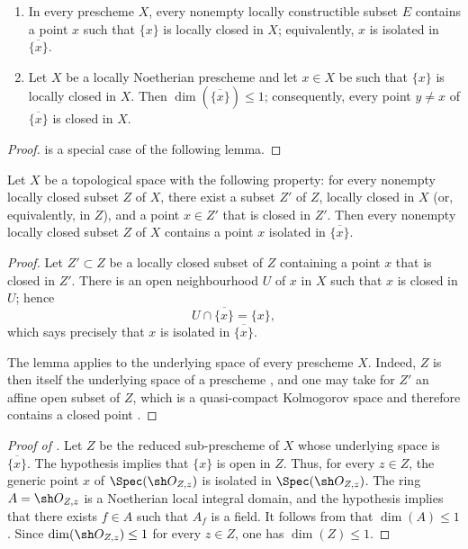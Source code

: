 \begin{proposition}[5.1.10]
\label{IV.5.1.10}
\begin{enumerate}[{\rm(i)}]
\item
{}
\label{IV.5.1.10.i}
In every prescheme $X$, every nonempty locally constructible subset
$E$ contains a point $x$ such that $\{x\}$ is locally closed in $X$;
equivalently, $x$ is isolated in $\overline{\{x\}}$.
\item
{}
\label{IV.5.1.10.ii}
Let $X$ be a locally Noetherian prescheme and let $x\in X$ be such
that $\{x\}$ is locally closed in $X$.
Then $\dim(\overline{\{x\}})\leq1$; consequently, every point
$y\ne x$ of $\overline{\{x\}}$ is closed in $X$.
\end{enumerate}
\end{proposition}

\begin{proof}
 is a special case of the following lemma.
\end{proof}

\begin{lemma}[5.1.10.1]
\label{IV.5.1.10.1}
Let $X$ be a topological space with the following property: for every
nonempty locally closed subset $Z$ of $X$, there exist a subset
$Z'$ of $Z$, locally closed in $X$ (or, equivalently, in $Z$), and
a point $x\in Z'$ that is closed in $Z'$.
Then every nonempty locally closed subset $Z$ of $X$ contains a point
$x$ isolated in $\overline{\{x\}}$.
\end{lemma}

\begin{proof}
Let $Z'\subset Z$ be a locally closed subset of $Z$ containing a
point $x$ that is closed in $Z'$.
There is an open neighbourhood $U$ of $x$ in $X$ such that $x$ is
closed in $U$; hence
\[
U\cap\overline{\{x\}}=\{x\},
\]
which says precisely that $x$ is isolated in $\overline{\{x\}}$.

The lemma applies to the underlying space of every prescheme $X$.
Indeed, $Z$ is then itself the underlying space of a prescheme
, and one may take for $Z'$ an affine open subset of
$Z$, which is a quasi-compact Kolmogorov space and therefore contains
a closed point .
\end{proof}


\begin{proof}[Proof of ]
Let $Z$ be the reduced sub-prescheme of $X$ whose underlying space is
$\overline{\{x\}}$.
The hypothesis implies that $\{x\}$ is open in $Z$.
Thus, for every $z\in Z$, the generic point $x$ of
$\Spec(\sh O_{Z,z})$ is isolated in $\Spec(\sh O_{Z,z})$.
The ring $A=\sh O_{Z,z}$ is a Noetherian local integral domain, and
the hypothesis implies that there exists $f\in A$ such that $A_f$ is
a field.
It follows from  that $\dim(A)\leq1$.
Since $\dim(\sh O_{Z,z})\leq1$ for every $z\in Z$, one has
$\dim(Z)\leq1$.
\end{proof}

